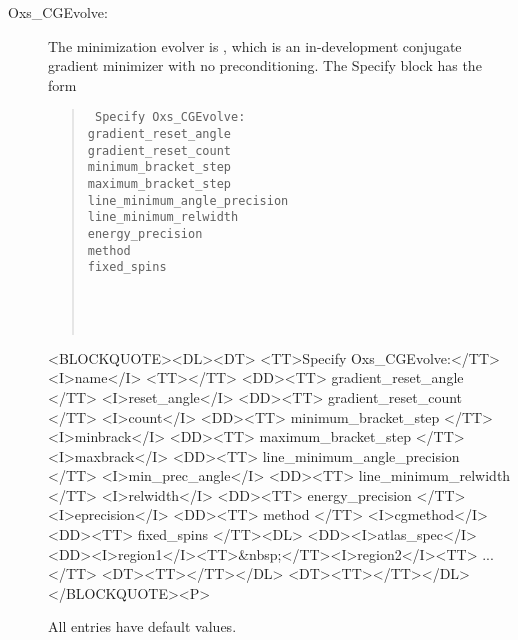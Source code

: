 \begin{description}
\item[Oxs\_CGEvolve:\label{HTMLCGEvolve}]
%
The minimization evolver is , which is an
in-development conjugate gradient minimizer with no preconditioning. The
Specify block has the form
   \begin{latexonly}
   \begin{quote}\tt
   Specify Oxs\_CGEvolve: \ocb\\
    \bi gradient\_reset\_angle   \\
    \bi gradient\_reset\_count   \\
    \bi minimum\_bracket\_step   \\
    \bi maximum\_bracket\_step   \\
    \bi line\_minimum\_angle\_precision \\
    \bi line\_minimum\_relwidth  \\
    \bi energy\_precision \\
    \bi method \\
    \bi fixed\_spins \ocb\\
    \bi\bi {}\\
    \bi\bi  {}\\
    \bi\ccb\\
   \ccb
   \end{quote}
   \end{latexonly}%
   \begin{rawhtml}
   <BLOCKQUOTE><DL><DT>
   <TT>Specify Oxs_CGEvolve:</TT><I>name</I> <TT>{</TT>
   <DD><TT> gradient_reset_angle </TT> <I>reset_angle</I>
   <DD><TT> gradient_reset_count </TT> <I>count</I>
   <DD><TT> minimum_bracket_step </TT> <I>minbrack</I>
   <DD><TT> maximum_bracket_step </TT> <I>maxbrack</I>
   <DD><TT> line_minimum_angle_precision </TT> <I>min_prec_angle</I>
   <DD><TT> line_minimum_relwidth </TT> <I>relwidth</I>
   <DD><TT> energy_precision </TT> <I>eprecision</I>
   <DD><TT> method </TT> <I>cgmethod</I>
   <DD><TT> fixed_spins {</TT><DL>
       <DD><I>atlas_spec</I>
       <DD><I>region1</I><TT>&nbsp;</TT><I>region2</I><TT> ...</TT>
       <DT><TT>}</TT></DL>
   <DT><TT>}</TT></DL></BLOCKQUOTE><P>
   \end{rawhtml}
All entries have default values.


\end{description}
